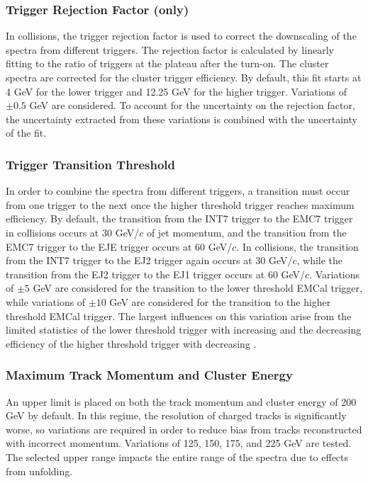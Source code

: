 \subsubsection{Trigger Rejection Factor (\pp only)}

In \pp collisions, the trigger rejection factor is used to correct the downscaling of the spectra from different triggers. The rejection factor is calculated by linearly fitting to the ratio of triggers at the plateau after the turn-on. The cluster spectra are corrected for the cluster trigger efficiency. By default, this fit starts at 4 GeV for the lower trigger and 12.25 GeV for the higher trigger. Variations of $\pm 0.5$ GeV are considered. To account for the uncertainty on the rejection factor, the uncertainty extracted from these variations is combined with the uncertainty of the fit.

\subsubsection{Trigger Transition Threshold}

In order to combine the spectra from different triggers, a transition must occur from one trigger to the next once the higher threshold trigger reaches maximum efficiency. By default, the transition from the INT7 trigger to the EMC7 trigger in \pp collisions occurs at 30 GeV/$c$ of jet momentum, and the transition from the EMC7 trigger to the EJE trigger occurs at 60 GeV/$c$. In \pPb collisions, the transition from the INT7 trigger to the EJ2 trigger again occurs at 30 GeV/$c$, while the transition from the EJ2 trigger to the EJ1 trigger occurs at 60 GeV/$c$. Variations of $\pm 5$ GeV are considered for the transition to the lower threshold EMCal trigger, while variations of $\pm 10$ GeV are considered for the transition to the higher threshold EMCal trigger. The largest influences on this variation arise from the limited statistics of the lower threshold trigger with increasing \pT and the decreasing efficiency of the higher threshold trigger with decreasing \pT.

\subsubsection{Maximum Track Momentum and Cluster Energy}

An upper limit is placed on both the track momentum and cluster energy of 200 GeV by default. In this regime, the \pT resolution of charged tracks is significantly worse, so variations are required in order to reduce bias from tracks reconstructed with incorrect momentum. Variations of 125, 150, 175, and 225 GeV are tested. The selected upper range impacts the entire range of the spectra due to effects from unfolding.

